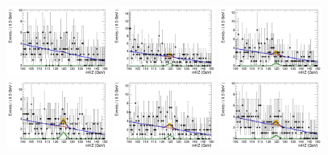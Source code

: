 \begin{figure}[!htbp]
\begin{center}
 \includegraphics[width=0.3\textwidth]{figures/modeling_xchecks/plots/HToUpsilon1SPhoton_Cat0_signalStrenght_100000/Cat0_mHZ_fit_s}
\includegraphics[width=0.3\textwidth]{figures/modeling_xchecks/plots/HToUpsilon2SPhoton_Cat0_signalStrenght_100000/Cat0_mHZ_fit_s}
\includegraphics[width=0.3\textwidth]{figures/modeling_xchecks/plots/HToUpsilon3SPhoton_Cat0_signalStrenght_100000/Cat0_mHZ_fit_s}
\includegraphics[width=0.3\textwidth]{figures/modeling_xchecks/plots/HToUpsilon1SPhoton_Cat0_signalStrenght_200000/Cat0_mHZ_fit_s}
\includegraphics[width=0.3\textwidth]{figures/modeling_xchecks/plots/HToUpsilon2SPhoton_Cat0_signalStrenght_200000/Cat0_mHZ_fit_s}
\includegraphics[width=0.3\textwidth]{figures/modeling_xchecks/plots/HToUpsilon3SPhoton_Cat0_signalStrenght_200000/Cat0_mHZ_fit_s}

\end{center}
\end{figure}
